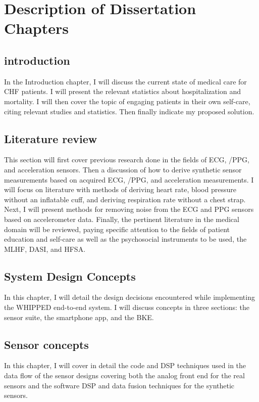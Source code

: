 \section{Description of Dissertation Chapters}
\iffalse
\subsection{ introduction}
\label{subsec:Chapter1Introduction}
In the Introduction chapter, I will discuss the current state of medical care for CHF patients. I will present the relevant statistics about hospitalization and mortality. I will then cover the topic of engaging patients in their own self-care, citing relevant studies and statistics. Then finally indicate my proposed solution.
\subsection{ Literature review}
\label{subsec:Chapter2LitReview}
This section will first cover previous research done in the fields of ECG,  /PPG, and acceleration sensors. Then a discussion of how to derive synthetic sensor measurements based on acquired ECG,  /PPG, and acceleration measurements. I will focus on literature with methods of deriving heart rate, blood pressure without an inflatable cuff, and deriving respiration rate without a chest strap. Next, I will present methods for removing noise from the ECG and PPG sensors based on accelerometer data. Finally, the pertinent literature in the medical domain will be reviewed, paying specific attention to the fields of patient education and self-care as well as the psychosocial instruments to be used, the MLHF, DASI, and HFSA.

\subsection{ System Design Concepts}
\label{subsec:Chapter3SystemDesignConcepts}
In this chapter, I will detail the design decisions encountered while implementing the WHIPPED end-to-end system. I will discuss concepts in three sections: the sensor suite, the smartphone app, and the BKE.

\subsection{ Sensor concepts}
\label{subsec:Chapter4SensorConcepts}
In this chapter, I will cover in detail the code and DSP techniques used in the data flow of the sensor designs covering both the analog front end for the real sensors and the software DSP and data fusion techniques for the synthetic sensors.

